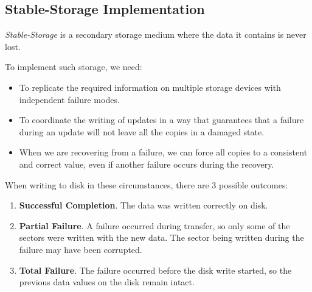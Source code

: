 \subsection{Stable-Storage Implementation}\label{subsec:Stable_Storage_Implementation}
\begin{definition}\label{def:Stable_Storage}
  \emph{Stable-Storage} is a secondary storage medium where the data it contains is never lost.
\end{definition}

To implement such storage, we need:
\begin{itemize}[noitemsep]
\item To replicate the required information on multiple storage devices with independent failure modes.
\item To coordinate the writing of updates in a way that guarantees that a failure during an update will not leave all the copies in a damaged state.
\item When we are recovering from a failure, we can force all copies to a consistent and correct value, even if another failure occurs during the recovery.
\end{itemize}

When writing to disk in these circumstances, there are 3 possible outcomes:
\begin{enumerate}[noitemsep]
\item \textbf{Successful Completion}.
  The data was written correctly on disk.
\item \textbf{Partial Failure}.
  A failure occurred during transfer, so only some of the sectors were written with the new data.
  The sector being written during the failure may have been corrupted.
\item \textbf{Total Failure}.
  The failure occurred before the disk write started, so the previous data values on the disk remain intact.
\end{enumerate}

